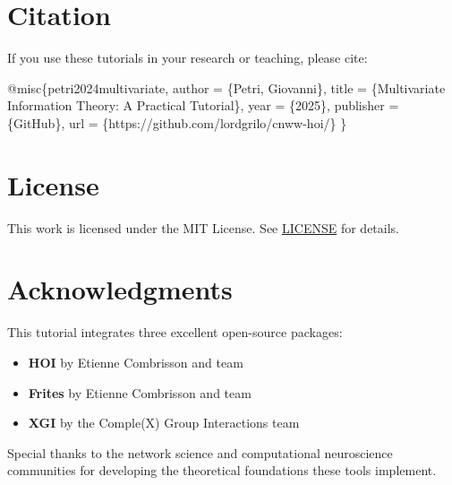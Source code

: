 \documentclass[
  11pt,
  letterpaper,
  oneside,
  openany]{book}
\newenvironment{Shaded}{\begin{snugshade}}{\end{snugshade}}
\newcommand{\DataTypeTok}[1]{\textcolor[rgb]{0.68,0.00,0.00}{#1}}
\newcommand{\NormalTok}[1]{\textcolor[rgb]{0.00,0.23,0.31}{#1}}
\newcommand{\OtherTok}[1]{\textcolor[rgb]{0.00,0.23,0.31}{#1}}
\newcommand{\VariableTok}[1]{\textcolor[rgb]{0.07,0.07,0.07}{#1}}
\providecommand{\tightlist}{%
  \setlength{\itemsep}{0pt}\setlength{\parskip}{0pt}}
\begin{document}
\section*{Citation}\label{citation}


If you use these tutorials in your research or teaching, please cite:

\begin{Shaded}
\begin{Highlighting}[]
\VariableTok{@misc}\NormalTok{\{}\OtherTok{petri2024multivariate}\NormalTok{,}
  \DataTypeTok{author}\NormalTok{ = \{Petri, Giovanni\},}
  \DataTypeTok{title}\NormalTok{ = \{Multivariate Information Theory: A Practical Tutorial\},}
  \DataTypeTok{year}\NormalTok{ = \{2025\},}
  \DataTypeTok{publisher}\NormalTok{ = \{GitHub\},}
  \DataTypeTok{url}\NormalTok{ = \{https://github.com/lordgrilo/cnww{-}hoi/\}}
\NormalTok{\}}
\end{Highlighting}
\end{Shaded}

\section*{License}\label{license}


This work is licensed under the MIT License. See \url{LICENSE} for
details.

\section*{Acknowledgments}\label{acknowledgments}


This tutorial integrates three excellent open-source packages:

\begin{itemize}
\tightlist
\item
  \textbf{HOI} by Etienne Combrisson and team
\item
  \textbf{Frites} by Etienne Combrisson and team\\
\item
  \textbf{XGI} by the Comple(X) Group Interactions team
\end{itemize}

Special thanks to the network science and computational neuroscience
communities for developing the theoretical foundations these tools
implement.
\end{document}
